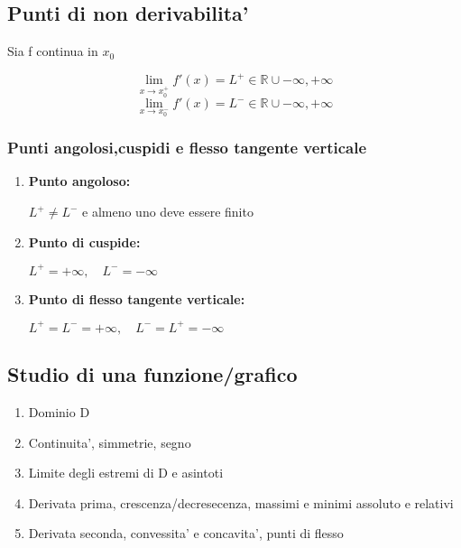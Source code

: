 \documentclass{article}
\begin{document}
        \subsection{Punti di non derivabilita'}
        \begin{flushleft}
          Sia f continua in $x_0$
        \end{flushleft}
        \begin{equation}
          \lim_{x \to x_0^+} f'(x)=L^+ \in \mathbb{R} \cup {-\infty,+\infty}
        \end{equation}
        \begin{equation}
          \lim_{x \to x_0^-} f'(x)=L^- \in \mathbb{R} \cup {-\infty,+\infty}
        \end{equation}
        \subsubsection{Punti angolosi,cuspidi e flesso tangente verticale}
        \begin{enumerate}
          \item \textbf{Punto angoloso:}
            \begin{flushleft}
              $L^+ \neq L^-$ e almeno uno deve essere finito
            \end{flushleft}
          \item \textbf{Punto di cuspide:}
            \begin{flushleft}
              $L^+=+\infty,\quad L^-=-\infty$
            \end{flushleft}
          \item \textbf{Punto di flesso tangente verticale:}
            \begin{flushleft}
              $L^+=L^-=+\infty,\quad L^-=L^+=-\infty$
            \end{flushleft}
        \end{enumerate}
        \subsection{Studio di una funzione/grafico}
        \begin{enumerate}
          \item Dominio D
          \item Continuita', simmetrie, segno
          \item Limite degli estremi di D e asintoti
          \item Derivata prima, crescenza/decresecenza, massimi e minimi assoluto e relativi
          \item Derivata seconda, convessita' e concavita', punti di flesso
        \end{enumerate}
\end{document}
